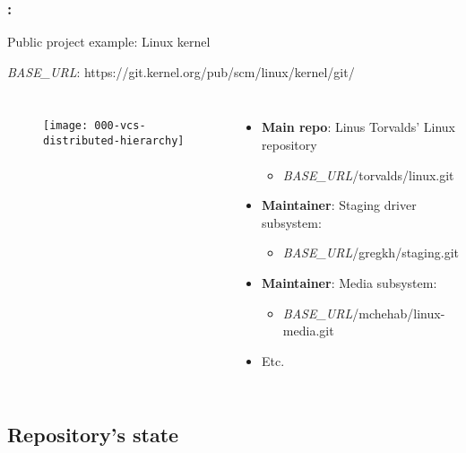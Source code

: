 \begin{frame}
    \frametitle{\secname: \small\subsecname\normalsize}

    Public project example: Linux kernel

    \textit{BASE\_URL}: \small https://git.kernel.org/pub/scm/linux/kernel/git/ \normalsize

    \begin{columns}
        \begin{figure}[h]
            \texttt{[image: 000-vcs-distributed-hierarchy]}
            \centering
        \end{figure}

        \begin{itemize}
            \item \textbf{Main repo}: Linus Torvalds' Linux repository
            \begin{itemize}
                \item \small \textit{BASE\_URL}/torvalds/linux.git \normalsize
            \end{itemize}
            \item \textbf{Maintainer}: Staging driver subsystem:
            \begin{itemize}
                \item \small \textit{BASE\_URL}/gregkh/staging.git \normalsize
            \end{itemize}
            \item \textbf{Maintainer}: Media subsystem:
            \begin{itemize}
                \item \small \textit{BASE\_URL}/mchehab/linux-media.git \normalsize
            \end{itemize}
            \item Etc.
        \end{itemize}
    \end{columns}
\end{frame}

\subsection{Repository's state}\label{repo-state}

